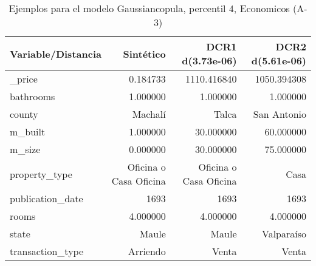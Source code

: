 \begin{table}[H]
\centering
\fontsize{10}{14}\selectfont
\caption{Ejemplos para el modelo Gaussiancopula, percentil 4, Economicos (A-3)}
\label{table-example-economicos-a-3-gaussiancopula-4p}
\begin{tabular}{|l|r|r|r|}
\hline
\rowcolor[gray]{0.8}
Variable/Distancia & Sintético & DCR1 d(3.73e-06) & DCR2 d(5.61e-06) \\
\hline \_price & \cellcolor[rgb]{0.9, 0.54, 0.52} 0.184733 & 1110.416840 & 1050.394308 \\
\hline bathrooms & \cellcolor[rgb]{0.9, 0.54, 0.52} 1.000000 & \cellcolor[rgb]{0.9, 0.54, 0.52} 1.000000 & \cellcolor[rgb]{0.9, 0.54, 0.52} 1.000000 \\
\hline county & \cellcolor[rgb]{0.9, 0.54, 0.52} Machalí & Talca & San Antonio \\
\hline m\_built & \cellcolor[rgb]{0.9, 0.54, 0.52} 1.000000 & 30.000000 & 60.000000 \\
\hline m\_size & \cellcolor[rgb]{0.9, 0.54, 0.52} 0.000000 & 30.000000 & 75.000000 \\
\hline property\_type & \cellcolor[rgb]{0.9, 0.54, 0.52} Oficina o Casa Oficina & \cellcolor[rgb]{0.9, 0.54, 0.52} Oficina o Casa Oficina & Casa \\
\hline publication\_date & \cellcolor[rgb]{0.9, 0.54, 0.52} 1693 & \cellcolor[rgb]{0.9, 0.54, 0.52} 1693 & \cellcolor[rgb]{0.9, 0.54, 0.52} 1693 \\
\hline rooms & \cellcolor[rgb]{0.9, 0.54, 0.52} 4.000000 & \cellcolor[rgb]{0.9, 0.54, 0.52} 4.000000 & \cellcolor[rgb]{0.9, 0.54, 0.52} 4.000000 \\
\hline state & \cellcolor[rgb]{0.9, 0.54, 0.52} Maule & \cellcolor[rgb]{0.9, 0.54, 0.52} Maule & Valparaíso \\
\hline transaction\_type & \cellcolor[rgb]{0.9, 0.54, 0.52} Arriendo & Venta & Venta \\
\hline
\end{tabular}
\end{table}
